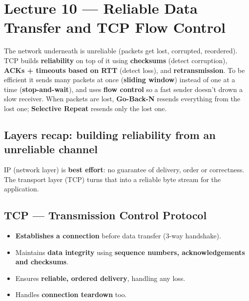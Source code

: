 \chapter{Lecture 10 --- Reliable Data Transfer and TCP Flow Control}

\begin{keyidea}
The network underneath is unreliable (packets get lost, corrupted, reordered). TCP builds \textbf{reliability} on top of it using \textbf{checksums} (detect corruption), \textbf{ACKs + timeouts based on RTT} (detect loss), and \textbf{retransmission}. To be efficient it sends many packets at once (\textbf{sliding window}) instead of one at a time (\textbf{stop-and-wait}), and uses \textbf{flow control} so a fast sender doesn't drown a slow receiver. When packets are lost, \textbf{Go-Back-N} resends everything from the lost one; \textbf{Selective Repeat} resends only the lost one.
\end{keyidea}

\section{Layers recap: building reliability from an unreliable channel}
IP (network layer) is \textbf{best effort}: no guarantee of delivery, order or correctness. The transport layer (TCP) turns that into a reliable byte stream for the application.

\begin{center}
\end{center}

\section{TCP --- Transmission Control Protocol}
\begin{itemize}
  \item \textbf{Establishes a connection} before data transfer (3-way handshake).
  \item Maintains \textbf{data integrity} using \textbf{sequence numbers, acknowledgements and checksums}.
  \item Ensures \textbf{reliable, ordered delivery}, handling any loss.
  \item Handles \textbf{connection teardown} too.
\end{itemize}

